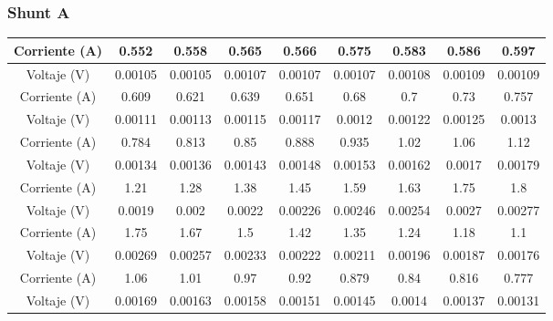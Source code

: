         \subsubsection{Shunt A}
            \begin{table} [H]
                \begin{center}
                    \begin{tabular}{ |c|c|c|c|c|c|c|c|c| }
                        \hline 
                        Corriente (A) & 0.552 & 0.558 & 0.565 & 0.566 & 0.575 & 0.583 & 0.586 & 0.597\\
                        \hline
                        Voltaje (V) & 0.00105 & 0.00105 & 0.00107 & 0.00107 & 0.00107 & 0.00108 & 0.00109 & 0.00109\\
                        \hline
                        \hline 
                        Corriente (A) & 0.609 & 0.621 & 0.639 & 0.651 & 0.68 & 0.7 & 0.73 & 0.757\\
                        \hline
                        Voltaje (V) & 0.00111 & 0.00113 & 0.00115 & 0.00117 & 0.0012 & 0.00122 & 0.00125 & 0.0013\\
                        \hline
                        \hline 
                        Corriente (A) & 0.784 & 0.813 & 0.85 & 0.888 & 0.935 & 1.02 & 1.06 & 1.12\\
                        \hline
                        Voltaje (V) & 0.00134 & 0.00136 & 0.00143 & 0.00148 & 0.00153 & 0.00162 & 0.0017 & 0.00179\\
                        \hline
                        \hline 
                        Corriente (A) & 1.21 & 1.28 & 1.38 & 1.45 & 1.59 & 1.63 & 1.75 & 1.8\\
                        \hline
                        Voltaje (V) & 0.0019 & 0.002 & 0.0022 & 0.00226 & 0.00246 & 0.00254 & 0.0027 & 0.00277\\
                        \hline
                        \hline 
                        Corriente (A) & 1.75 & 1.67 & 1.5 & 1.42 & 1.35 & 1.24 & 1.18 & 1.1\\
                        \hline
                        Voltaje (V) & 0.00269 & 0.00257 & 0.00233 & 0.00222 & 0.00211 & 0.00196 & 0.00187 & 0.00176\\
                        \hline
                        \hline 
                        Corriente (A) & 1.06 & 1.01 & 0.97 & 0.92 & 0.879 & 0.84 & 0.816 & 0.777\\
                        \hline
                        Voltaje (V) & 0.00169 & 0.00163 & 0.00158 & 0.00151 & 0.00145 & 0.0014 & 0.00137 & 0.00131\\

\end{tabular}
\end{center}
\end{table}
